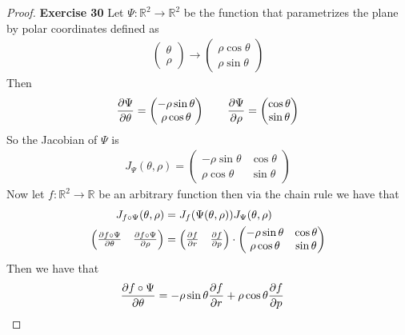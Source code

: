 \documentclass[11pt]{article}
\newcommand{\R}{\mathbb{R}}
\theoremstyle{definition}
\begin{document}
\cleardoublepage
\begin{proof}{\textbf{Exercise 30}}
Let $\Psi: \R^2 \to \R^2$ be the function that parametrizes the plane by polar
coordinates defined as 
\begin{align*}
    \begin{pmatrix} \theta\\ \rho \end{pmatrix}
    \to \begin{pmatrix} \rho\cos\theta\\ \rho\sin\theta \end{pmatrix}
\end{align*}
Then
\begin{align*}
    \pdv{\Psi}{\theta} = \begin{pmatrix} -\rho\sin\theta\\ \rho\cos\theta
    \end{pmatrix}\qquad
    \pdv{\Psi}{\rho} = \begin{pmatrix} \cos\theta\\ \sin\theta\end{pmatrix}
\end{align*}
So the Jacobian of $\Psi$ is
\begin{align*}
    J_{\Psi}(\theta, \rho) =
    \begin{pmatrix}
        -\rho\sin\theta & \cos\theta\\
        \rho\cos\theta & \sin\theta
    \end{pmatrix}
\end{align*}
Now let $f:\R^2 \to \R$ be an arbitrary function then via the chain rule
we have that
\begin{align*}
    J_{f \circ \Psi}(\theta, \rho) 
    &= J_{f}(\Psi(\theta, \rho))J_{\Psi}(\theta, \rho)\\
    \begin{pmatrix} \pdv{f\circ\Psi}{\theta} & \pdv{f\circ\Psi}{\rho}
    \end{pmatrix}
    &=
    \begin{pmatrix} \pdv{f}{r} & \pdv{f}{p}
    \end{pmatrix}\cdot
    \begin{pmatrix}
        -\rho\sin\theta & \cos\theta\\
        \rho\cos\theta & \sin\theta
    \end{pmatrix}
\end{align*}
Then we have that
\begin{align*}
    \pdv{f\circ\Psi}{\theta}
    &= -\rho\sin\theta\pdv{f}{r} + \rho\cos\theta\pdv{f}{p}

\end{align*}
\end{proof}
\end{document}
